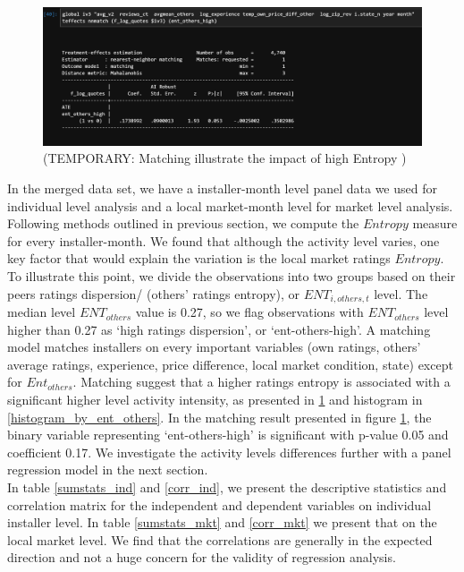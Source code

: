 \documentclass[msom,blindrev]{informs3}
\begin{document}
\begin{figure}
	\centering
	\includegraphics[width=0.7\linewidth]{match_te_ent.png}
	\caption{(TEMPORARY:  Matching illustrate the impact of high Entropy )}
	\label{te_match_entothers}
\end{figure}
In the merged data set, we have a installer-month level panel data we used for individual level analysis and a local market-month level for market level analysis. Following methods outlined in previous section, we compute the $Entropy$ measure for every installer-month. We found that although the activity level varies, one key factor that would explain the variation is the local market ratings $Entropy$. To illustrate this point, we divide the observations into two groups based on their peers ratings dispersion/ (others' ratings entropy), or $ENT_{i,others,t}$ level. The median level $ENT_{others}$ value is 0.27, so we flag observations with $ENT_{others}$ level higher than 0.27 as `high ratings dispersion', or `ent-others-high'. A matching model matches installers on every important variables (own ratings, others' average ratings, experience, price difference, local market condition, state) except for $Ent_{others}$. Matching suggest that a higher ratings entropy is associated with a significant higher level activity intensity, as presented in \ref{te_match_entothers} and histogram in \ref{histogram_by_ent_others}. In the matching result presented in figure \ref{te_match_entothers}, the binary variable representing `ent-others-high' is significant with p-value 0.05 and coefficient 0.17.  We investigate the activity levels differences further with a panel regression model in the next section.  \\ 
In table \ref{sumstats_ind} and \ref{corr_ind}, we present the descriptive statistics and correlation matrix for the independent and dependent variables on individual installer level.  In table \ref{sumstats_mkt} and \ref{corr_mkt} we present that on the local market level. We find that the correlations are generally in the expected direction and not a huge concern for the validity of regression analysis.





\end{document}

